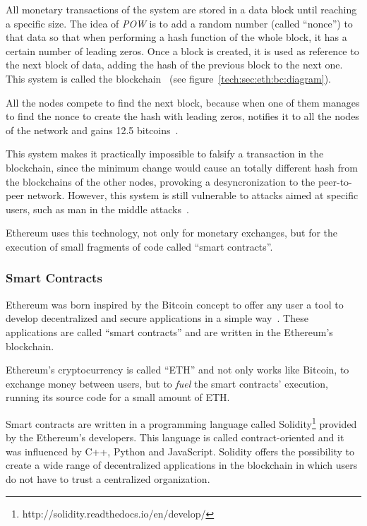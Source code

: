 All monetary transactions of the system are stored in a data block until
reaching a specific size. The idea of \emph{POW} is to add a random number
(called ``nonce'') to that data so that when performing a hash function of the
whole block, it has a certain number of leading zeros. Once a block is created,
it is used as reference to the next block of data, adding the hash of the
previous block to the next one. This system is called the
blockchain~\cite{antonopoulos2014mastering} (see
figure~\ref{tech:sec:eth:bc:diagram}).


All the nodes compete to find the next block, because when one of them manages
to find the nonce to create the hash with leading zeros, notifies it to all the
nodes of the network and gains 12.5 bitcoins~\cite{barber2012bitter}.

This system makes it practically impossible to falsify a transaction in the
blockchain, since the minimum change would cause an totally different hash from
the blockchains of the other nodes, provoking a desyncronization to the
peer-to-peer network. However, this system is still vulnerable to attacks aimed
at specific users, such as man in the middle attacks~\cite{moore2013beware}.

Ethereum uses this technology, not only for monetary exchanges, but for the
execution of small fragments of code called ``smart contracts''.

\subsubsection*{Smart Contracts}
\label{tech:sec:ethereum:sm}

Ethereum was born inspired by the Bitcoin concept to offer any user a tool to
develop decentralized and secure applications in a simple
way~\cite{buterin2014ethereum}. These applications are called ``smart
contracts'' and are written in the Ethereum's blockchain.

Ethereum's cryptocurrency is called ``ETH'' and not only works like Bitcoin, to
exchange money between users, but to \emph{fuel} the smart contracts' execution,
running its source code for a small amount of ETH.

Smart contracts are written in a programming language called
Solidity\footnote{http://solidity.readthedocs.io/en/develop/} provided by the
Ethereum's developers. This language is called contract-oriented and it was
influenced by C++, Python and JavaScript. Solidity offers the possibility to
create a wide range of decentralized applications in the blockchain in which
users do not have to trust a centralized organization.

